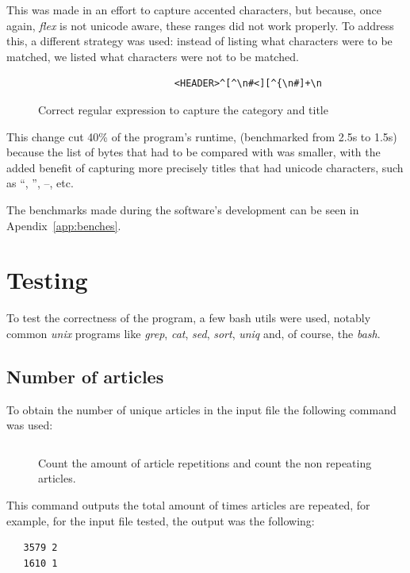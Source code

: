 \documentclass[a4paper]{report}
\begin{document}
This was made in an effort to capture accented characters, but because, once
again, \textit{flex} is not unicode aware, these ranges did not work properly.
To address this, a different strategy was used: instead of listing what
characters were to be matched, we listed what characters were not to be
matched.

\begin{figure}[H]
    \centering
    \begin{verbatim}
                        <HEADER>^[^\n#<][^{\n#]+\n
    \end{verbatim}
    \caption{Correct regular expression to capture the category and title}\label{fig:new-regex}
\end{figure}

This change cut 40\% of the program's runtime, (benchmarked from 2.5s to 1.5s)
because the list of bytes that had to be compared with was smaller, with the
added benefit of capturing more precisely titles that had unicode characters,
such as  ``,  '', --, etc.

The benchmarks made during the software's development can be seen in Apendix~\ref{app:benches}.

\chapter{Testing}

To test the correctness of the program, a few bash utils were used, notably common \textit{unix} programs like \textit{grep}, \textit{cat}, \textit{sed}, \textit{sort}, \textit{uniq} and, of course, the \textit{bash}.

\section{Number of articles}

To obtain the number of unique articles in the input file the following command
was used:
\begin{figure}[H]
    \inputminted{bash}{./test_number_of_articles.sh}
    \caption{Count the amount of article repetitions and count the non repeating
    articles.}
\end{figure}

This command outputs the total amount of times articles are repeated, for
example, for the input file tested, the output was the following:

\begin{verbatim}
   3579 2
   1610 1
\end{verbatim}
\end{document}
